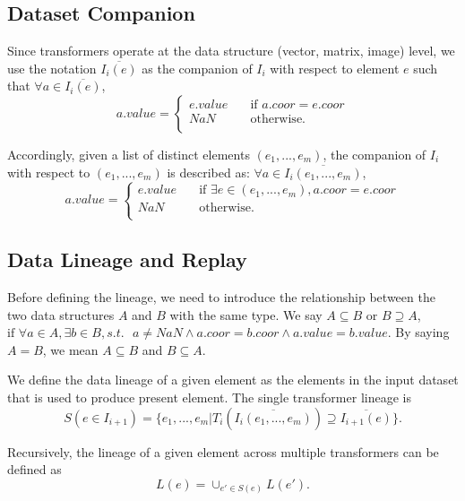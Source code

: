 \documentclass{sig-alternate}
\begin{document}
\subsection{Dataset Companion}
Since transformers operate at the data structure (vector, matrix, image) level, we use the notation
$\overline{I_i(e)}$ as the companion of $I_i$ with respect to element $e$ such that $\forall a \in \overline{I_i(e)}$,
\[ a.value =
  \begin{cases}
    e.value       & \quad \text{if } a.coor = e.coor\\
    NaN  & \quad \text{otherwise}. \\
  \end{cases}
\]

Accordingly, given a list of distinct elements $(e_1, ..., e_m)$, the companion of $I_i$ with respect to $(e_1, ..., e_m)$ is
described as: $\forall a \in \overline{I_i(e_1, ..., e_m)}$, 
\[ a.value =
  \begin{cases}
    e.value       & \quad \text{if } \exists e \in (e_1,...,e_m), a.coor = e.coor\\
    NaN  & \quad \text{otherwise}. \\
  \end{cases}
\]


\subsection{Data Lineage and Replay}
Before defining the lineage, we need to introduce the relationship between the two data structures $A$ and $B$ with the same type.
We say $A \subseteq B \text{ or } B \supseteq A$, $\text{if }\forall a \in A, \exists b \in B, s.t.\text{ } a \neq NaN \land a.coor = b.coor \land a.value = b.value$.
By saying $A = B$, we mean $A \subseteq B$ and $B \subseteq A$.

We define the data lineage of a given element as the elements in the input dataset that is used to produce present element.
The single transformer lineage is
\begin{equation}
S(e \in I_{i+1}) = \{e_1, ..., e_m | T_i(\overline{I_i(e_1, ..., e_m)}) \supseteq \overline{I_{i+1}(e)}\}.
\label{equa:SingleLineage}
\end{equation}


Recursively, the lineage of a given element across multiple transformers can be defined as
\begin{equation}
L(e) = \cup_{e' \in S(e)} L(e').
\end{equation}
\end{document}
